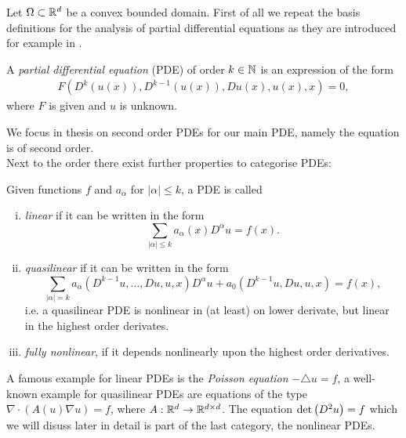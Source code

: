 Let $\Omega \subset \mathbb{R}^d $ be a convex bounded domain.
First of all we repeat the basis definitions for the analysis of partial differential equations as they are introduced for example in \cite{Evans1998}.
\begin{definition}
 A \emph{partial differential equation} (PDE) of order $k\in \mathbb{N}$ is an expression of the form
\begin{align}
	F(D^k(u(x)), D^{k-1}(u(x)), Du(x), u(x), x) = 0, \label{eq:general PDE}
\end{align}
where $F$ is given and $u$ is unknown.
\end{definition}
We focus in thesis on second order PDEs for our main PDE, namely the \MA equation is of second order. 
\\Next to the order there exist further properties to categorise PDEs:
\begin{definition}
	Given functions  $f$ and $a_{\alpha} $ for $|\alpha| \leq k$, a PDE is called
	\begin{enumerate}[(i)]
		\item \emph{linear} if it can be written in the form
		\[
			\sum_{|\alpha| \leq k} a_{\alpha} (x) D^{\alpha} u = f(x).
		\] 
		
		
		\item \emph{quasilinear} if it can be written in the form
		\[
			\sum_{|\alpha| = k} a_{\alpha}(D^{k-1}u, \dots, Du, u, x) D^{\alpha} u + a_0(D^{k-1}u, Du, u, x)= f(x),
		\]	
		i.e. a quasilinear PDE is nonlinear in (at least) on lower derivate, but linear in the highest order derivates.
		
		\item \emph{fully nonlinear}, if it depends nonlinearly upon the highest order derivatives.
	\end{enumerate}
\end{definition}
A famous example for linear PDEs is the \emph{Poisson equation} $-\triangle u = f$,
a well-known example for quasilinear PDEs are equations of the type $\nabla \cdot (A(u) \nabla u) = f$, where $A: \mathbb{R}^d \rightarrow \mathbb{R}^{d \times d}  $. The \MA equation $\det{\left(D^2 u\right)} = f$ which we will disuss later in detail is part of the last category, the nonlinear PDEs. 


